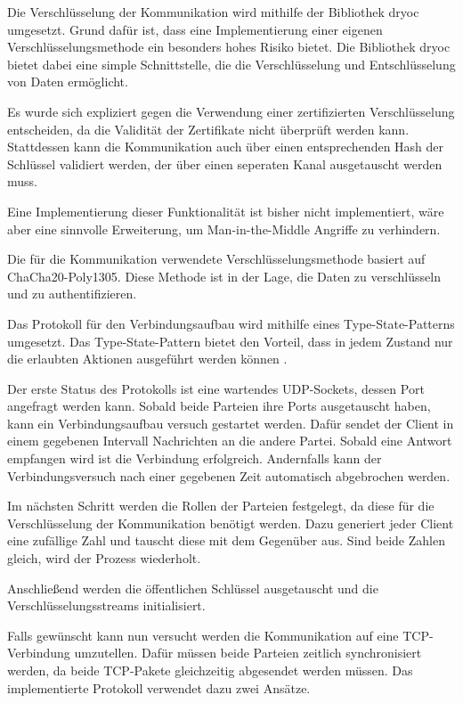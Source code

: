 Die Verschlüsselung der Kommunikation wird mithilfe der Bibliothek dryoc umgesetzt. Grund dafür ist, dass eine Implementierung einer eigenen Verschlüsselungsmethode ein besonders hohes Risiko bietet. Die Bibliothek dryoc bietet dabei eine simple Schnittstelle, die die Verschlüsselung und Entschlüsselung von Daten ermöglicht.

Es wurde sich expliziert gegen die Verwendung einer zertifizierten Verschlüsselung entscheiden, da die Validität der Zertifikate nicht überprüft werden kann. Stattdessen kann die Kommunikation auch über einen entsprechenden Hash der Schlüssel validiert werden, der über einen seperaten Kanal ausgetauscht werden muss.

Eine Implementierung dieser Funktionalität ist bisher nicht implementiert, wäre aber eine sinnvolle Erweiterung, um Man-in-the-Middle Angriffe zu verhindern.

Die für die Kommunikation verwendete Verschlüsselungsmethode basiert auf ChaCha20-Poly1305. Diese Methode ist in der Lage, die Daten zu verschlüsseln und zu authentifizieren. \cite{google-2015}

Das Protokoll für den Verbindungsaufbau wird mithilfe eines Type-State-Patterns umgesetzt. Das Type-State-Pattern bietet den Vorteil, dass in jedem Zustand nur die erlaubten Aktionen ausgeführt werden können \cite{Apodaca-2023}.

Der erste Status des Protokolls ist eine wartendes UDP-Sockets, dessen Port angefragt werden kann. Sobald beide Parteien ihre Ports ausgetauscht haben, kann ein Verbindungsaufbau versuch gestartet werden. Dafür sendet der Client in einem gegebenen Intervall Nachrichten an die andere Partei. Sobald eine Antwort empfangen wird ist die Verbindung erfolgreich. Andernfalls kann der Verbindungsversuch nach einer gegebenen Zeit automatisch abgebrochen werden.

Im nächsten Schritt werden die Rollen der Parteien festgelegt, da diese für die Verschlüsselung der Kommunikation benötigt werden. Dazu generiert jeder Client eine zufällige Zahl und tauscht diese mit dem Gegenüber aus. Sind beide Zahlen gleich, wird der Prozess wiederholt.

Anschließend werden die öffentlichen Schlüssel ausgetauscht und die Verschlüsselungsstreams initialisiert.

Falls gewünscht kann nun versucht werden die Kommunikation auf eine TCP-Verbindung umzutellen. Dafür müssen beide Parteien zeitlich synchronisiert werden, da beide TCP-Pakete gleichzeitig abgesendet werden müssen. Das implementierte Protokoll verwendet dazu zwei Ansätze.

